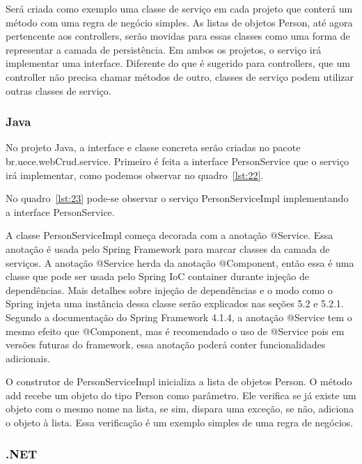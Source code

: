 \documentclass[a4paper,12pt]{article}
\newcommand{\javacode}[3] {
	
	\FloatBarrier
}
\begin{document}
Será criada como exemplo uma classe de serviço em cada projeto que conterá um método com uma regra de negócio simples. As listas de objetos Person, até agora pertencente aos controllers, serão movidas para essas classes como uma forma de representar a camada de persistência. Em ambos os projetos, o serviço irá implementar uma interface. Diferente do que é sugerido para controllers, que um controller não precisa chamar métodos de outro, classes de serviço podem utilizar outras classes de serviço.

\subsubsection{Java}

No projeto Java, a interface e classe concreta serão criadas no pacote br.uece.webCrud.service. Primeiro é feita a interface PersonService que o serviço irá implementar, como podemos observar no quadro~\ref{lst:22}.

\javacode{code/22.txt}{Interface PersonService}{lst:22}

No quadro~\ref{lst:23} pode-se observar o serviço PersonServiceImpl implementando a interface PersonService.

\javacode{code/23.txt}{Classe PersonServiceImpl}{lst:23}

A classe PersonServiceImpl começa decorada com a anotação @Service. Essa anotação é usada pelo Spring Framework para marcar classes da camada de serviços. A anotação @Service herda da anotação @Component, então essa é uma classe que pode ser usada pelo Spring IoC container durante injeção de dependências. Mais detalhes sobre injeção de dependências e o modo como o Spring injeta uma instância dessa classe serão explicados nas seções 5.2 e 5.2.1. Segundo a documentação do Spring Framework 4.1.4, a anotação @Service tem o mesmo efeito que @Component, mas é recomendado o uso de @Service pois em versões futuras do framework, essa anotação poderá conter funcionalidades adicionais.

O construtor de PersonServiceImpl inicializa a lista de objetos Person. O método add recebe um objeto do tipo Person como parâmetro. Ele verifica se já existe um objeto com o mesmo nome na lista, se sim, dispara uma exceção, se não, adiciona o objeto à lista. Essa verificação é um exemplo simples de uma regra de negócios.

\subsubsection{.NET}
\end{document}
